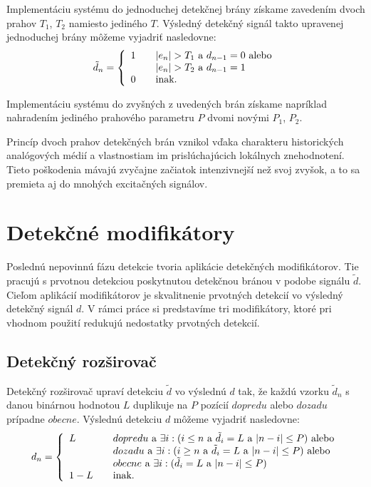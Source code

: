Implementáciu systému do jednoduchej detekčnej brány získame zavedením dvoch prahov $T_1$, $T_2$ namiesto jediného $T$. Výsledný detekčný signál takto upravenej jednoduchej brány môžeme vyjadriť nasledovne:
$$\tilde{d}_n = \left\{\begin{array}{l l}
	1 & \quad \text{$|e_n|>T_1$ a $d_{n-1}=0$ alebo}\\
	 & \quad \text{$|e_n|>T_2$ a $d_{n-1}=1$}\\
	0 & \quad \text{inak}.\\
\end{array} \right.$$

Implementáciu systému do zvyšných z uvedených brán získame napríklad nahradením jediného prahového parametru $P$ dvomi novými $P_1$, $P_2$. 

Princíp dvoch prahov detekčných brán vznikol vďaka charakteru historických analógových médií a vlastnostiam im prislúchajúcich lokálnych znehodnotení. Tieto poškodenia mávajú zvyčajne začiatok intenzivnejší než svoj zvyšok, a to sa premieta aj do mnohých excitačných signálov.


\section{Detekčné modifikátory}
Poslednú nepovinnú fázu detekcie tvoria aplikácie detekčných modifikátorov. Tie pracujú s prvotnou detekciou poskytnutou detekčnou bránou v podobe signálu $\tilde{d}$. Cieľom aplikácií modifikátorov je skvalitnenie prvotných detekcií vo výsledný detekčný signál $d$. V rámci práce si predstavíme tri modifikátory, ktoré pri vhodnom použití redukujú nedostatky prvotných detekcií.

\subsection{Detekčný rozširovač}
Detekčný rozširovač upraví detekciu $\tilde{d}$ vo výslednú $d$ tak, že každú vzorku $\tilde{d}_n$ s danou binárnou hodnotou $L$ duplikuje na $P$ pozícií $dopredu$ alebo $dozadu$ prípadne $obecne$. Výslednú detekciu $d$ môžeme vyjadriť nasledovne:
$$d_n = \left\{\begin{array}{l l}
	L & \quad \text{$dopredu$ a $\exists i : (i \leq n$ a $\tilde{d}_i=L$ a $|n-i| \leq P$) alebo}\\
	& \quad \text{$dozadu$ a $\exists i : (i \geq n$ a $\tilde{d}_i=L$ a $|n-i| \leq P$) alebo}\\	
	& \quad \text{$obecne$ a $\exists i : (\tilde{d}_i=L$ a $|n-i| \leq P$)}\\
	1-L & \quad \text{inak}.\\
\end{array} \right.$$

